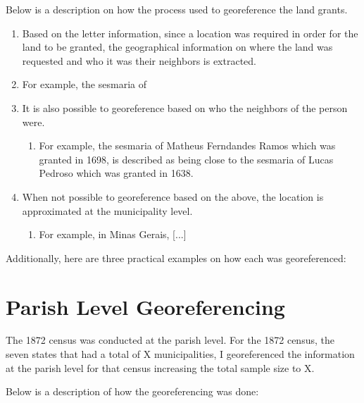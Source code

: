 \documentclass{article}
\begin{document}
Below is a description on how the process used to georeference the land grants.

\begin{enumerate}
  \item Based on the letter information, since a location was required in order for the land to be granted, the geographical information on where the land was requested and who it was their neighbors is extracted.
  \item For example, the sesmaria of 
  \item It is also possible to georeference based on who the neighbors of the person were. 
  \begin{enumerate}
    \item For example, the sesmaria of Matheus Ferndandes Ramos which was granted in 1698, is described as being close to the sesmaria of Lucas Pedroso which was granted in 1638. 
  \end{enumerate}
  \item When not possible to georeference based on the above, the location is approximated at the municipality level. 
  \begin{enumerate}
    \item For example, in Minas Gerais, [...]
  \end{enumerate}
\end{enumerate}

Additionally, here are three practical examples on how each was georeferenced: 

\clearpage

\section{Parish Level Georeferencing}
\label{app:georeferencing_parishes}

The 1872 census was conducted at the parish level. For the 1872 census, the seven states that had a total of X municipalities, I georeferenced the information at the parish level for that census increasing the total sample size to X.

Below is a description of how the georeferencing was done:
\end{document}
